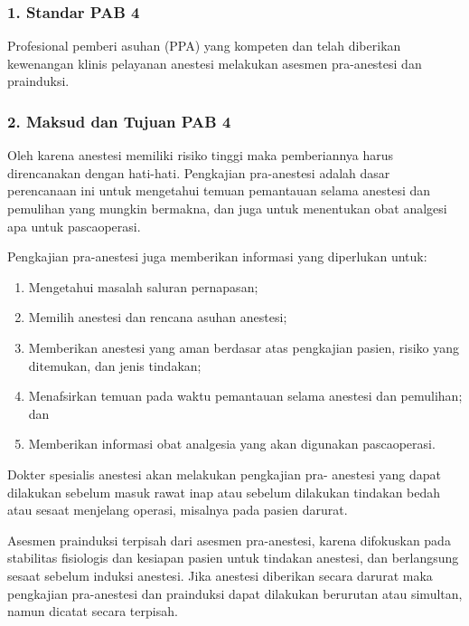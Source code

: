 \documentclass[
]{book}
\providecommand{\tightlist}{%
  \setlength{\itemsep}{0pt}\setlength{\parskip}{0pt}}
\begin{document}
\hypertarget{standar-pab-4}{%
\subsubsection*{1. Standar PAB 4}\label{standar-pab-4}}

Profesional pemberi asuhan (PPA) yang kompeten dan telah diberikan kewenangan klinis pelayanan anestesi melakukan asesmen pra-anestesi dan prainduksi.

\hypertarget{maksud-dan-tujuan-pab-4}{%
\subsubsection*{2. Maksud dan Tujuan PAB 4}\label{maksud-dan-tujuan-pab-4}}

Oleh karena anestesi memiliki risiko tinggi maka pemberiannya harus direncanakan dengan hati-hati. Pengkajian pra-anestesi adalah dasar perencanaan ini untuk mengetahui temuan pemantauan selama anestesi dan pemulihan yang mungkin bermakna, dan juga untuk menentukan obat analgesi apa untuk pascaoperasi.

Pengkajian pra-anestesi juga memberikan informasi yang diperlukan untuk:

\begin{enumerate}
\def\labelenumi{\alph{enumi}.}
\tightlist
\item
  Mengetahui masalah saluran pernapasan;
\item
  Memilih anestesi dan rencana asuhan anestesi;
\item
  Memberikan anestesi yang aman berdasar atas pengkajian pasien, risiko yang ditemukan, dan jenis tindakan;
\item
  Menafsirkan temuan pada waktu pemantauan selama anestesi dan pemulihan; dan
\item
  Memberikan informasi obat analgesia yang akan digunakan pascaoperasi.
\end{enumerate}

Dokter spesialis anestesi akan melakukan pengkajian pra- anestesi yang dapat dilakukan sebelum masuk rawat inap atau sebelum dilakukan tindakan bedah atau sesaat menjelang operasi, misalnya pada pasien darurat.

Asesmen prainduksi terpisah dari asesmen pra-anestesi, karena difokuskan pada stabilitas fisiologis dan kesiapan pasien untuk tindakan anestesi, dan berlangsung sesaat sebelum induksi anestesi. Jika anestesi diberikan secara darurat maka pengkajian pra-anestesi dan prainduksi dapat dilakukan berurutan atau simultan, namun dicatat secara terpisah.
\end{document}
